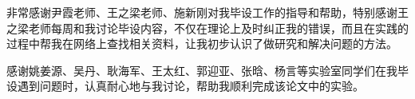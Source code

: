 
\begin{ack}
  非常感谢尹霞老师、王之梁老师、施新刚对我毕设工作的指导和帮助，特别感谢王之梁老师每周和我讨论毕设内容，不仅在理论上及时纠正我的错误，而且在实践的过程中帮我在网络上查找相关资料，让我初步认识了做研究和解决问题的方法。
  
  感谢姚姜源、吴丹、耿海军、王太红、郭迎亚、张晗、杨言等实验室同学们在我毕设遇到问题时，认真耐心地与我讨论，帮助我顺利完成该论文中的实验。
\end{ack}
